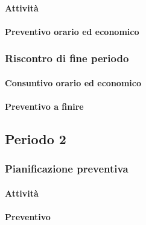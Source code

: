
\paragraph{Attività}

\planningTable{
	
}

\paragraph{Preventivo orario ed economico}



\subsubsection{Riscontro di fine periodo}


\paragraph{Consuntivo orario ed economico}


\paragraph{Preventivo a finire}

\pafTable{
	
}




\subsection{Periodo 2}

\subsubsection{Pianificazione preventiva}

\paragraph{Attività}

\planningTable{
	
}

\paragraph{Preventivo}

